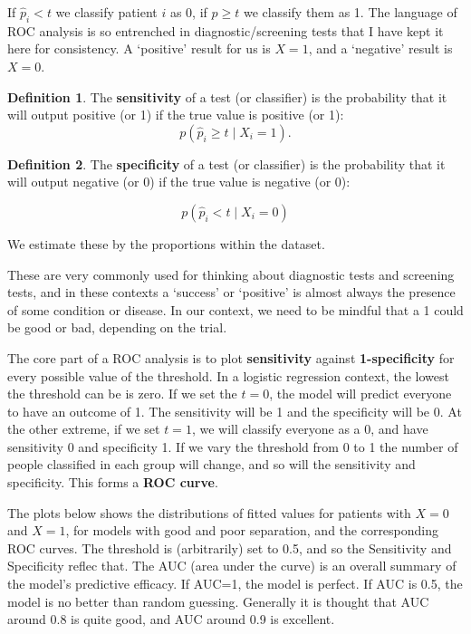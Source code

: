 \documentclass[
  openany]{book}
\theoremstyle{definition}
\newtheorem{definition}{Definition}[chapter]
\theoremstyle{definition}
\theoremstyle{definition}
\theoremstyle{definition}
\theoremstyle{remark}
\begin{document}
If \(\hat{p}_i<t\) we classify patient \(i\) as 0, if \(\hat{p}\geq t\) we classify them as 1. The language of ROC analysis is so entrenched in diagnostic/screening tests that I have kept it here for consistency. A `positive' result for us is \(X=1\), and a `negative' result is \(X=0\).

\begin{definition}
The \textbf{sensitivity} of a test (or classifier) is the probability that it will output positive (or 1) if the true value is positive (or 1):
\[p\left(\hat{p}_i \geq t \mid{X_i=1}\right).\]
\end{definition}

\begin{definition}
The \textbf{specificity} of a test (or classifier) is the probability that it will output negative (or 0) if the true value is negative (or 0):

\[p\left(\hat{p}_i < t \mid{X_i=0}\right) \]
\end{definition}

We estimate these by the proportions within the dataset.

These are very commonly used for thinking about diagnostic tests and screening tests, and in these contexts a `success' or `positive' is almost always the presence of some condition or disease. In our context, we need to be mindful that a 1 could be good or bad, depending on the trial.

The core part of a ROC analysis is to plot \textbf{sensitivity} against \textbf{1-specificity} for every possible value of the threshold. In a logistic regression context, the lowest the threshold can be is zero. If we set the \(t=0\), the model will predict everyone to have an outcome of 1. The sensitivity will be 1 and the specificity will be 0. At the other extreme, if we set \(t=1\), we will classify everyone as a 0, and have sensitivity 0 and specificity 1. If we vary the threshold from 0 to 1 the number of people classified in each group will change, and so will the sensitivity and specificity. This forms a \textbf{ROC curve}.

The plots below shows the distributions of fitted values for patients with \(X=0\) and \(X=1\), for models with good and poor separation, and the corresponding ROC curves. The threshold is (arbitrarily) set to 0.5, and so the Sensitivity and Specificity reflec that. The AUC (area under the curve) is an overall summary of the model's predictive efficacy. If AUC=1, the model is perfect. If AUC is 0.5, the model is no better than random guessing. Generally it is thought that AUC around 0.8 is quite good, and AUC around 0.9 is excellent.
\end{document}
